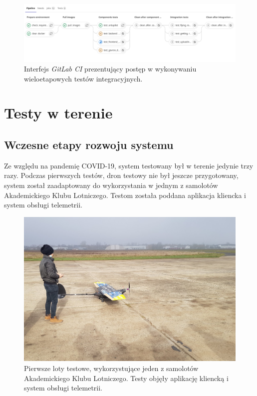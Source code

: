 \begin{figure}[H]
	\centering
	\includegraphics[width=\linewidth]{rys05/pipeline.png}
    \caption{
        Interfejs \textit{GitLab CI} prezentujący postęp w wykonywaniu
        wieloetapowych testów integracyjnych.
    }
	\label{pipeline_gitlab_ci}
\end{figure}

\section{Testy w terenie}

\subsection{Wczesne etapy rozwoju systemu} \label{early_tests}

Ze względu na pandemię COVID-19, system testowany był w terenie jedynie trzy razy.
Podczas pierwszych testów, dron testowy nie był jeszcze przygotowany, system został 
zaadaptowany do wykorzystania w jednym z samolotów Akademickiego Klubu Lotniczego.
Testom została poddana aplikacja kliencka i system obsługi telemetrii.

\begin{figure}[H]
	\centering
	\includegraphics[width=0.8\linewidth]{rys05/test_sae.jpg}
    \caption{
        Pierwsze loty testowe, wykorzystujące jeden z samolotów Akademickiego
        Klubu Lotniczego. Testy objęły aplikację kliencką i system obsługi telemetrii.
    }
	\label{test_sae}
\end{figure}

